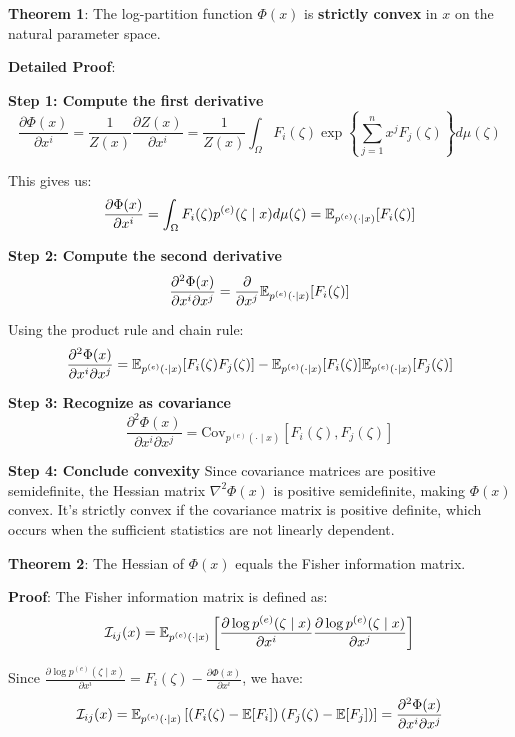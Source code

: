 \documentclass{amsart}
\let\originalmathbb\mathbb
\renewcommand{\mathbb}[1]{%
    \ifstrequal{#1}{1}{\mathbbm{#1}}{\originalmathbb{#1}}%
}
\theoremstyle{plain}
\theoremstyle{definition}
\theoremstyle{remark}
\begin{document}
\textbf{Theorem 1}: The log-partition function $\Phi(x)$ is \textbf{strictly convex} in $x$ on the natural parameter space.

\textbf{Detailed Proof}:

\textbf{Step 1: Compute the first derivative}
\[
\frac{\partial \Phi(x)}{\partial x^i} = \frac{1}{Z(x)} \frac{\partial Z(x)}{\partial x^i} = \frac{1}{Z(x)} \int_{\Omega} F_i(\zeta) \exp\left\{\sum_{j=1}^n x^j F_j(\zeta)\right\} d\mu(\zeta)
\]

This gives us:
\[
\frac{\partial \Phi(x)}{\partial x^i} = \int_{\Omega} F_i(\zeta) p^{(e)}(\zeta \mid x) d\mu(\zeta) = \mathbb{E}_{p^{(e)}(\cdot \mid x)}[F_i(\zeta)]
\]

\textbf{Step 2: Compute the second derivative}
\[
\frac{\partial^2 \Phi(x)}{\partial x^i \partial x^j} = \frac{\partial}{\partial x^j} \mathbb{E}_{p^{(e)}(\cdot \mid x)}[F_i(\zeta)]
\]

Using the product rule and chain rule:
\[
\frac{\partial^2 \Phi(x)}{\partial x^i \partial x^j} = \mathbb{E}_{p^{(e)}(\cdot \mid x)}[F_i(\zeta) F_j(\zeta)] - \mathbb{E}_{p^{(e)}(\cdot \mid x)}[F_i(\zeta)] \mathbb{E}_{p^{(e)}(\cdot \mid x)}[F_j(\zeta)]
\]

\textbf{Step 3: Recognize as covariance}
\[
\frac{\partial^2 \Phi(x)}{\partial x^i \partial x^j} = \text{Cov}_{p^{(e)}(\cdot \mid x)}[F_i(\zeta), F_j(\zeta)]
\]

\textbf{Step 4: Conclude convexity}
Since covariance matrices are positive semidefinite, the Hessian matrix $\nabla^2 \Phi(x)$ is positive semidefinite, making $\Phi(x)$ convex. It's strictly convex if the covariance matrix is positive definite, which occurs when the sufficient statistics are not linearly dependent.

\textbf{Theorem 2}: The Hessian of $\Phi(x)$ equals the Fisher information matrix.

\textbf{Proof}: The Fisher information matrix is defined as:
\[
\mathcal{I}_{ij}(x) = \mathbb{E}_{p^{(e)}(\cdot \mid x)}\left[\frac{\partial \log p^{(e)}(\zeta \mid x)}{\partial x^i} \frac{\partial \log p^{(e)}(\zeta \mid x)}{\partial x^j}\right]
\]

Since $\frac{\partial \log p^{(e)}(\zeta \mid x)}{\partial x^i} = F_i(\zeta) - \frac{\partial \Phi(x)}{\partial x^i}$, we have:
\[
\mathcal{I}_{ij}(x) = \mathbb{E}_{p^{(e)}(\cdot \mid x)}\left[\left(F_i(\zeta) - \mathbb{E}[F_i]\right)\left(F_j(\zeta) - \mathbb{E}[F_j]\right)\right] = \frac{\partial^2 \Phi(x)}{\partial x^i \partial x^j}
\]
\end{document}
